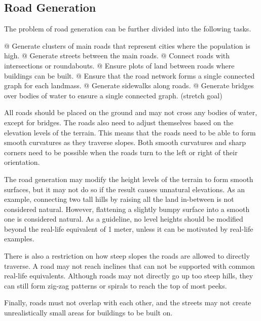 \subsection{Road Generation}

The problem of road generation can be further divided into the following tasks.

\begin{easylist}
  @ Generate clusters of main roads that represent cities where the population is high.
  @ Generate streets between the main roads.
  @ Connect roads with intersections or roundabouts.
  @ Ensure plots of land between roads where buildings can be built.
  @ Ensure that the road network forms a single connected graph for each landmass.
  @ Generate sidewalks along roads.
  @ Generate bridges over bodies of water to ensure a single connected graph. (stretch goal)
\end{easylist}

All roads should be placed on the ground and may not cross any bodies of water, except for bridges.
The roads also need to adjust themselves based on the elevation levels of the terrain.
This means that the roads need to be able to form smooth curvatures as they traverse slopes.
Both smooth curvatures and sharp corners need to be possible when the roads turn to the left or right of their orientation.

The road generation may modify the height levels of the terrain to form smooth surfaces, but it may not do so if the result causes unnatural elevations.
As an example, connecting two tall hills by raising all the land in-between is not considered natural.
However, flattening a slightly bumpy surface into a smooth one is considered natural.
As a guideline, no level heights should be modified beyond the real-life equivalent of 1 meter, unless it can be motivated by real-life examples.

There is also a restriction on how steep slopes the roads are allowed to directly traverse.
A road may not reach inclines that can not be supported with common real-life equivalents.
Although roads may not directly go up too steep hills, they can still form zig-zag patterns or spirals to reach the top of most peeks.

Finally, roads must not overlap with each other, and the streets may not create unrealistically small areas for buildings to be built on.